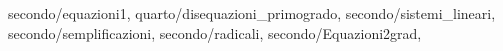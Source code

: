   secondo/equazioni1,
  quarto/disequazioni_primogrado,
 secondo/sistemi_lineari,
	secondo/semplificazioni,
	secondo/radicali,
	secondo/Equazioni2grad,
	